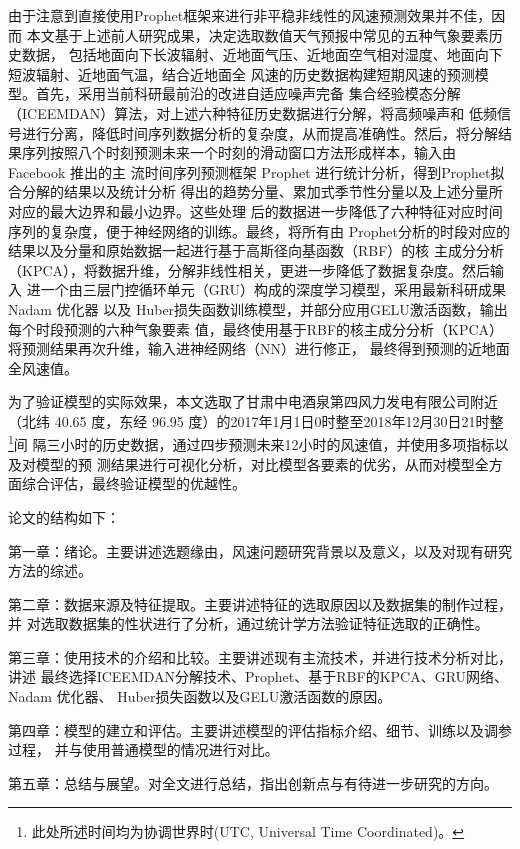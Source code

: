\documentclass[AutoFakeBold]{LZUThesis}
\begin{document}
由于注意到直接使用Prophet框架来进行非平稳非线性的风速预测效果并不佳，因而
本文基于上述前人研究成果，决定选取数值天气预报中常见的五种气象要素历史数据，
包括地面向下长波辐射、近地面气压、近地面空气相对湿度、地面向下短波辐射、近地面气温，结合近地面全
风速的历史数据构建短期风速的预测模型。首先，采用当前科研最前沿的改进自适应噪声完备
集合经验模态分解（ICEEMDAN）算法，对上述六种特征历史数据进行分解，将高频噪声和
低频信号进行分离，降低时间序列数据分析的复杂度，从而提高准确性。然后，将分解结
果序列按照八个时刻预测未来一个时刻的滑动窗口方法形成样本，输入由 Facebook 推出的主
流时间序列预测框架 Prophet 进行统计分析，得到Prophet拟合分解的结果以及统计分析
得出的趋势分量、累加式季节性分量以及上述分量所对应的最大边界和最小边界。这些处理
后的数据进一步降低了六种特征对应时间序列的复杂度，便于神经网络的训练。最终，将所有由
Prophet分析的时段对应的结果以及分量和原始数据一起进行基于高斯径向基函数（RBF）的核
主成分分析（KPCA），将数据升维，分解非线性相关，更进一步降低了数据复杂度。然后输入
进一个由三层门控循环单元（GRU）构成的深度学习模型，采用最新科研成果 Nadam 优化器
以及 Huber损失函数训练模型，并部分应用GELU激活函数，输出每个时段预测的六种气象要素
值，最终使用基于RBF的核主成分分析（KPCA）将预测结果再次升维，输入进神经网络（NN）进行修正，
最终得到预测的近地面全风速值。

为了验证模型的实际效果，本文选取了甘肃中电酒泉第四风力发电有限公司附近（北纬
40.65 度，东经 96.95 度）的2017年1月1日0时整至2018年12月30日21时整
\footnote{此处所述时间均为协调世界时(UTC, Universal Time Coordinated)。}间
隔三小时的历史数据，通过四步预测未来12小时的风速值，并使用多项指标以及对模型的预
测结果进行可视化分析，对比模型各要素的优劣，从而对模型全方面综合评估，最终验证模型的优越性。

论文的结构如下：

第一章：绪论。主要讲述选题缘由，风速问题研究背景以及意义，以及对现有研究
方法的综述。

第二章：数据来源及特征提取。主要讲述特征的选取原因以及数据集的制作过程，并
对选取数据集的性状进行了分析，通过统计学方法验证特征选取的正确性。

第三章：使用技术的介绍和比较。主要讲述现有主流技术，并进行技术分析对比，讲述
最终选择ICEEMDAN分解技术、Prophet、基于RBF的KPCA、GRU网络、Nadam 优化器、
Huber损失函数以及GELU激活函数的原因。

第四章：模型的建立和评估。主要讲述模型的评估指标介绍、细节、训练以及调参过程，
并与使用普通模型的情况进行对比。

第五章：总结与展望。对全文进行总结，指出创新点与有待进一步研究的方向。
\end{document}
